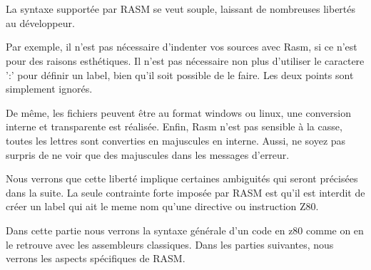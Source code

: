 \section{}

\begin{xfr}
  La syntaxe supportée par RASM se veut souple, laissant de nombreuses libertés au développeur.

  Par exemple, il n'est pas nécessaire d'indenter vos sources avec Rasm, si ce n'est pour des raisons esthétiques.
  Il n'est pas nécessaire non plus d'utiliser le caractere ':' pour définir un label, bien qu'il soit possible de le faire.
  Les deux points sont simplement ignorés.

  De même, les fichiers peuvent être au format windows ou linux, une conversion interne et transparente est réalisée.
  Enfin, Rasm n'est pas sensible à la casse, toutes les lettres sont converties en majuscules en interne.
  Aussi, ne soyez pas surpris de ne voir que des majuscules dans les messages d'erreur.

  Nous verrons que cette liberté implique certaines ambiguités qui seront précisées dans la suite.
  La seule contrainte forte imposée par RASM est qu'il est interdit de créer un label qui ait le meme nom qu'une directive ou instruction Z80.

  Dans cette partie nous verrons la syntaxe générale d'un code en z80 comme on en le retrouve avec les assembleurs classiques. Dans les parties suivantes, nous verrons les aspects spécifiques de RASM.
\end{xfr}

